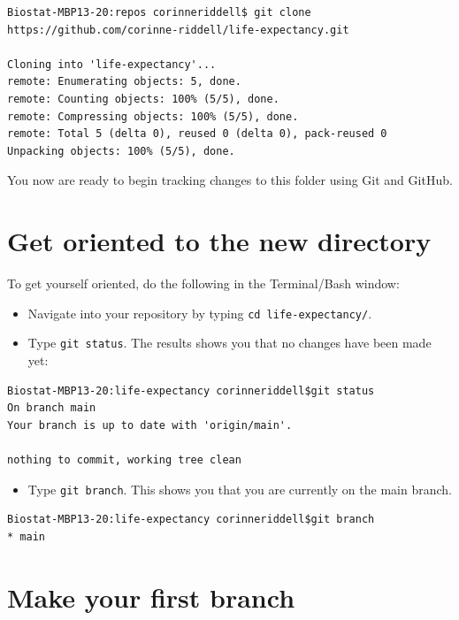 \documentclass[
]{book}
\providecommand{\tightlist}{%
  \setlength{\itemsep}{0pt}\setlength{\parskip}{0pt}}
\begin{document}
\begin{verbatim}
Biostat-MBP13-20:repos corinneriddell$ git clone https://github.com/corinne-riddell/life-expectancy.git

Cloning into 'life-expectancy'...
remote: Enumerating objects: 5, done.
remote: Counting objects: 100% (5/5), done.
remote: Compressing objects: 100% (5/5), done.
remote: Total 5 (delta 0), reused 0 (delta 0), pack-reused 0
Unpacking objects: 100% (5/5), done.
\end{verbatim}

You now are ready to begin tracking changes to this folder using Git and GitHub.

\hypertarget{get-oriented-to-the-new-directory}{%
\section{Get oriented to the new directory}\label{get-oriented-to-the-new-directory}}

To get yourself oriented, do the following in the Terminal/Bash window:

\begin{itemize}
\tightlist
\item
  Navigate into your repository by typing \texttt{cd\ life-expectancy/}.
\item
  Type \texttt{git\ status}. The results shows you that no changes have been made yet:
\end{itemize}

\begin{verbatim}
Biostat-MBP13-20:life-expectancy corinneriddell$git status
On branch main
Your branch is up to date with 'origin/main'.

nothing to commit, working tree clean
\end{verbatim}

\begin{itemize}
\tightlist
\item
  Type \texttt{git\ branch}. This shows you that you are currently on the main branch.
\end{itemize}

\begin{verbatim}
Biostat-MBP13-20:life-expectancy corinneriddell$git branch
* main
\end{verbatim}

\hypertarget{make-your-first-branch}{%
\section{Make your first branch}\label{make-your-first-branch}}
\end{document}

